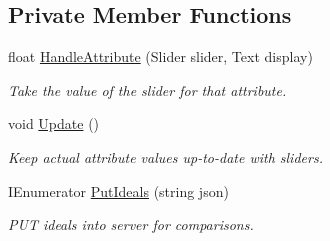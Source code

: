 \subsection*{Private Member Functions}
\begin{DoxyCompactItemize}
\item 
\mbox{\label{class_personality_creation_a60f9fca99fc7cf87fe6db7778684776e}} 
float \mbox{\hyperlink{class_personality_creation_a60f9fca99fc7cf87fe6db7778684776e}{Handle\+Attribute}} (Slider slider, Text display)
\begin{DoxyCompactList}\small\item\em Take the value of the slider for that attribute. \end{DoxyCompactList}\item 
\mbox{\label{class_personality_creation_a42a823afe83e0b59d3c4119a9a58574c}} 
void \mbox{\hyperlink{class_personality_creation_a42a823afe83e0b59d3c4119a9a58574c}{Update}} ()
\begin{DoxyCompactList}\small\item\em Keep actual attribute values up-\/to-\/date with sliders. \end{DoxyCompactList}\item 
\mbox{\label{class_personality_creation_aa8e27efd53fd6cbc698c84a863fbcafa}} 
I\+Enumerator \mbox{\hyperlink{class_personality_creation_aa8e27efd53fd6cbc698c84a863fbcafa}{Put\+Ideals}} (string json)
\begin{DoxyCompactList}\small\item\em P\+UT ideals into server for comparisons. \end{DoxyCompactList}\end{DoxyCompactItemize}
